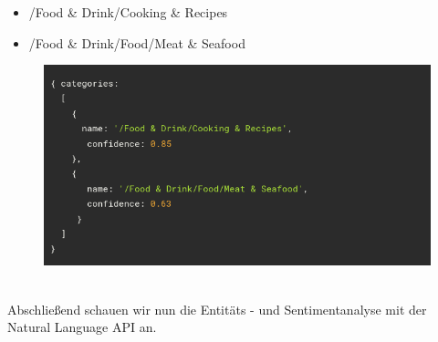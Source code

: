 \documentclass[12pt,a4paper]{article}
\begin{document}
\begin{itemize}
	\item /Food \& Drink/Cooking \& Recipes
	\item /Food \& Drink/Food/Meat \& Seafood
\end{itemize}
\newpage
\begin{figure}[h!]
	\centering
	\includegraphics[width=0.8\linewidth]{../images/response_category}
	\label{fig:responsecategory}
\end{figure}
\ \\
Abschließend schauen wir nun die Entitäts - und Sentimentanalyse mit der Natural Language API an.




\newpage
\
\newpage
\thispagestyle{empty}
\printbibliography
\end{document}
